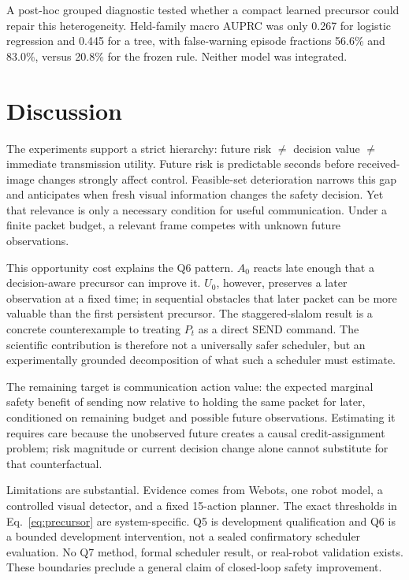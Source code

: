 \documentclass[letterpaper,10pt,conference]{ieeeconf}
\begin{document}
A post-hoc grouped diagnostic tested whether a compact learned precursor could
repair this heterogeneity. Held-family macro AUPRC was only 0.267 for logistic
regression and 0.445 for a tree, with false-warning episode fractions 56.6\%
and 83.0\%, versus 20.8\% for the frozen rule. Neither model was integrated.

\balance
\section{Discussion}

The experiments support a strict hierarchy: future risk $\neq$ decision value
$\neq$ immediate transmission utility.
Future risk is predictable seconds before received-image changes strongly
affect control. Feasible-set deterioration narrows this gap and anticipates
when fresh visual information changes the safety decision. Yet that relevance
is only a necessary condition for useful communication. Under a finite packet
budget, a relevant frame competes with unknown future observations.

This opportunity cost explains the Q6 pattern. $A_0$ reacts late enough that a
decision-aware precursor can improve it. $U_0$, however, preserves a later
observation at a fixed time; in sequential obstacles that later packet can be
more valuable than the first persistent precursor. The staggered-slalom result
is a concrete counterexample to treating $P_t$ as a direct SEND command. The
scientific contribution is therefore not a universally safer scheduler, but an
experimentally grounded decomposition of what such a scheduler must estimate.

The remaining target is communication action value: the expected marginal
safety benefit of sending now relative to holding the same packet for later,
conditioned on remaining budget and possible future observations. Estimating
it requires care because the unobserved future creates a causal credit-assignment
problem; risk magnitude or current decision change alone cannot substitute for
that counterfactual.

Limitations are substantial. Evidence comes from Webots, one robot model, a
controlled visual detector, and a fixed 15-action planner. The exact thresholds
in Eq.~\eqref{eq:precursor} are system-specific. Q5 is development
qualification and Q6 is a bounded development intervention, not a sealed
confirmatory scheduler evaluation. No Q7 method, formal scheduler result, or
real-robot validation exists. These boundaries preclude a general claim of
closed-loop safety improvement.
\end{document}
